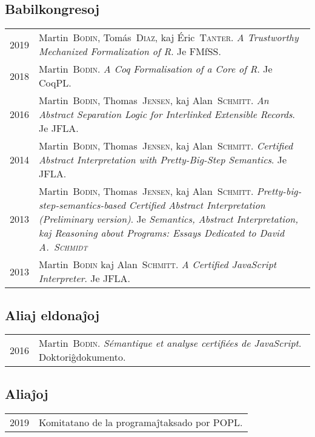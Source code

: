 \documentclass[12pt,a4paper]{article}
\makeatletter
\newenvironment{datecvsection}[1]%
               {\subsection*{#1}%
                 \noindent \begin{tabular}{@{}p{\annee}p{\texte}@{}}}
               {\end{tabular}}
\newcommand\familyName{\textsc}
\makeatother
\begin{document}
\begin{datecvsection}{Babilkongresoj}

  2019 & Martin~\familyName{Bodin}, Tomás~\familyName{Diaz}, kaj Éric~\familyName{Tanter}. \textit{A Trustworthy Mechanized Formalization of R}. Je FMfSS. \\

  2018 & Martin~\familyName{Bodin}. \textit{A Coq Formalisation of a Core of R}. Je CoqPL. \\

  2016 & Martin~\familyName{Bodin}, Thomas~\familyName{Jensen}, kaj Alan~\familyName{Schmitt}. \textit{An Abstract Separation Logic for Interlinked Extensible Records}. Je JFLA. \\

  2014 & Martin~\familyName{Bodin}, Thomas~\familyName{Jensen}, kaj Alan~\familyName{Schmitt}. \textit{Certified Abstract Interpretation with Pretty-Big-Step Semantics}. Je JFLA. \\

  2013 & Martin~\familyName{Bodin}, Thomas~\familyName{Jensen}, kaj Alan~\familyName{Schmitt}. \textit{Pretty-big-step-semantics-based Certified Abstract Interpretation (Preliminary version)}. Je \textit{Semantics, Abstract Interpretation, kaj Reasoning about Programs: Essays Dedicated to David A.~\familyName{Schmidt}} \\ %

  2013 & Martin~\familyName{Bodin} kaj Alan~\familyName{Schmitt}. \textit{A Certified JavaScript Interpreter}. Je JFLA. \\

\end{datecvsection}

\begin{datecvsection}{Aliaj eldonaĵoj}

    2016 & Martin~\familyName{Bodin}. \textit{Sémantique et analyse certifiées de JavaScript}. Doktoriĝdokumento. \\

\end{datecvsection}

\begin{datecvsection}{Aliaĵoj}

    2019 & Komitatano de la programaĵtaksado por POPL. \\

\end{datecvsection}
\end{document}
